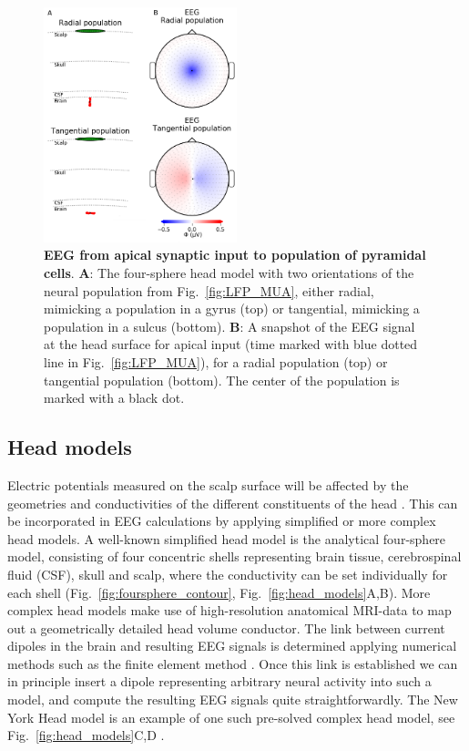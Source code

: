 \documentclass[preprint,11pt,authoryear]{elsarticle}
\begin{document}
\begin{figure}[!ht]
\begin{center}
\includegraphics[width=0.5\textwidth]{population_EEG_MEG_cut.png}
\end{center}
\caption{\textbf{EEG from apical synaptic input to population of pyramidal cells}.
{\bf A}: The four-sphere head model with two orientations of the neural population from Fig.~\ref{fig:LFP_MUA}, either radial, mimicking a population in a gyrus (top) or tangential, mimicking a population in a sulcus (bottom).
{\bf B}: A snapshot of the EEG signal at the head surface for apical input (time marked with blue dotted line in Fig.~\ref{fig:LFP_MUA}), for a radial population (top) or tangential population (bottom).
The center of the population is marked with a black dot.
}
\label{fig:EEG_MEG}
\end{figure}

\subsection{Head models}
Electric potentials measured on the scalp surface will be affected by the geometries and conductivities of the different constituents of the head \citep{Nunez2006}. This can be incorporated in EEG calculations by applying simplified or more complex head models.
A well-known simplified head model is the analytical four-sphere model, consisting of four concentric shells representing brain tissue, cerebrospinal fluid (CSF), skull and scalp, where the conductivity can be set individually for each shell \citep{Naess2017, Srinivasan1998, Nunez2006} (Fig.~\ref{fig:foursphere_contour}, Fig.~\ref{fig:head_models}A,B).
More complex head models make use of high-resolution anatomical MRI-data to map out a geometrically detailed head volume conductor. The link between current dipoles in the brain and resulting EEG signals is determined applying numerical methods such as the finite element method \citep{Larson2013, Logg2012}. Once this link is established we can in principle insert a dipole representing arbitrary neural activity into such a model, and compute the resulting EEG signals quite straightforwardly. The New York Head model is an example of one such pre-solved complex head model, see Fig.~\ref{fig:head_models}C,D \citep{Huang2016}.
\end{document}
